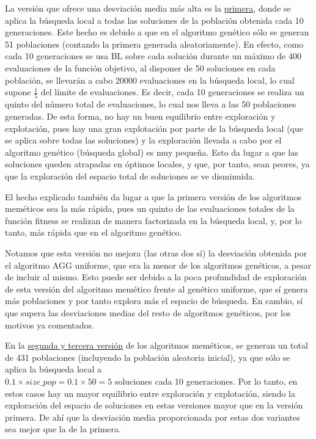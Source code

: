 \documentclass[10pt,a4paper]{article}
\begin{document}
	La versión que ofrece una desviación media más alta es la \underline{primera}, donde se aplica la búsqueda local a todas las soluciones de la población obtenida cada 10 generaciones. Este hecho es debido a que en el algoritmo genético sólo se generan 51 poblaciones (contando la primera generada aleatoriamente). En efecto, como cada 10 generaciones se usa BL sobre cada solución durante un máximo de 400 evaluaciones de la función objetivo, al disponer de 50 soluciones en cada población, se llevarán a cabo 20000 evaluaciones en la búsqueda local, lo cual supone $\frac{1}{5}$ del límite de evaluaciones. Es decir, cada 10 generaciones se realiza un quinto del número total de evaluaciones, lo cual nos lleva a las 50 poblaciones generadas. De esta forma, no hay un buen equilibrio entre exploración y explotación, pues hay una gran explotación por parte de la búsqueda local (que se aplica sobre todas las soluciones) y la exploración llevada a cabo por el algoritmo genético (búsqueda global) es muy pequeña. Esto da lugar a que las soluciones queden atrapadas en óptimos locales, y que, por tanto, sean peores, ya que la exploración del espacio total de soluciones se ve disminuida. 
	
	El hecho explicado también da lugar a que la primera versión de los algoritmos meméticos sea la más rápida, pues un quinto de las evaluaciones totales de la función fitness se realizan de manera factorizada en la búsqueda local, y, por lo tanto, más rápida que en el algoritmo genético. 
	
	Notamos que esta versión no mejora (las otras dos sí) la desviación obtenida por el algoritmo AGG uniforme, que era la menor de los algoritmos genéticos, a pesar de incluir al mismo. Esto puede ser debido a la poca profundidad de exploración de esta versión del algoritmo memético frente al genético uniforme, que sí genera más poblaciones y por tanto explora más el espacio de búsqueda. En cambio, sí que supera las desviaciones medias del resto de algoritmos genéticos, por los motivos ya comentados. 
	
	En la \underline{segunda y tercera versión} de los algoritmos meméticos, se generan un total de 431 poblaciones (incluyendo la población aleatoria inicial), ya que sólo se aplica la búsqueda local a\\ $0.1\times size\_pop=0.1\times 50 = 5$ soluciones cada 10 generaciones. Por lo tanto, en estos casos hay un mayor equilibrio entre exploración y explotación, siendo la exploración del espacio de soluciones en estas versiones mayor que en la versión primera. De ahí que la desviación media proporcionada por estas dos variantes sea mejor que la de la primera. 
	
\end{document}
